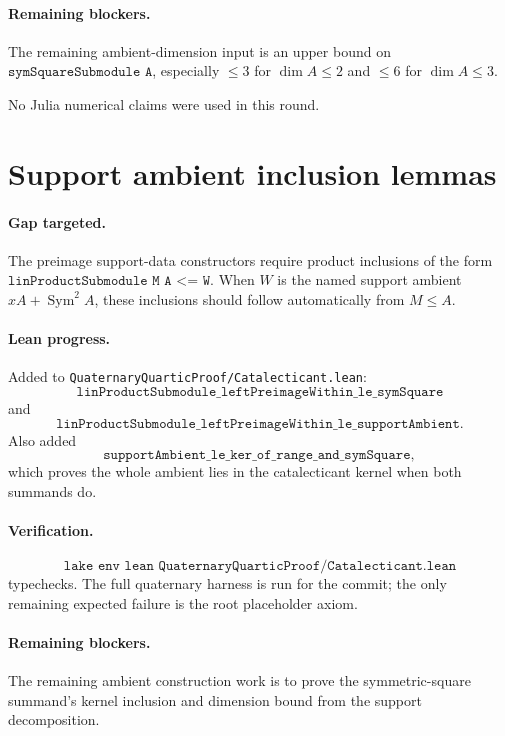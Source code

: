 \documentclass[11pt]{article}
\begin{document}
\paragraph{Remaining blockers.}
The remaining ambient-dimension input is an upper bound on
\(\texttt{symSquareSubmodule A}\), especially \(\le3\) for \(\dim A\le2\) and
\(\le6\) for \(\dim A\le3\).

No Julia numerical claims were used in this round.

\section*{Support ambient inclusion lemmas}

\paragraph{Gap targeted.}
The preimage support-data constructors require product inclusions of the form
\(\texttt{linProductSubmodule M A <= W}\).  When \(W\) is the named support
ambient \(xA+\operatorname{Sym}^2A\), these inclusions should follow
automatically from \(M\le A\).

\paragraph{Lean progress.}
Added to \texttt{QuaternaryQuarticProof/Catalecticant.lean}:
\[
\texttt{linProductSubmodule\_leftPreimageWithin\_le\_symSquare}
\]
and
\[
\texttt{linProductSubmodule\_leftPreimageWithin\_le\_supportAmbient}.
\]
Also added
\[
\texttt{supportAmbient\_le\_ker\_of\_range\_and\_symSquare},
\]
which proves the whole ambient lies in the catalecticant kernel when both
summands do.

\paragraph{Verification.}
\[
\texttt{lake env lean QuaternaryQuarticProof/Catalecticant.lean}
\]
typechecks.  The full quaternary harness is run for the commit; the only
remaining expected failure is the root placeholder axiom.

\paragraph{Remaining blockers.}
The remaining ambient construction work is to prove the symmetric-square
summand's kernel inclusion and dimension bound from the support decomposition.
\end{document}
